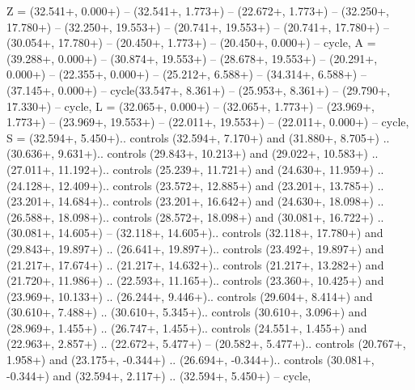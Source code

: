 {Z} = {(32.541+\ctpXshift, 0.000+\ctpYshift) -- (32.541+\ctpXshift, 1.773+\ctpYshift) -- (22.672+\ctpXshift, 1.773+\ctpYshift) -- (32.250+\ctpXshift, 17.780+\ctpYshift) -- (32.250+\ctpXshift, 19.553+\ctpYshift) -- (20.741+\ctpXshift, 19.553+\ctpYshift) -- (20.741+\ctpXshift, 17.780+\ctpYshift) -- (30.054+\ctpXshift, 17.780+\ctpYshift) -- (20.450+\ctpXshift, 1.773+\ctpYshift) -- (20.450+\ctpXshift, 0.000+\ctpYshift) -- cycle},
{A} = {(39.288+\ctpXshift, 0.000+\ctpYshift) -- (30.874+\ctpXshift, 19.553+\ctpYshift) -- (28.678+\ctpXshift, 19.553+\ctpYshift) -- (20.291+\ctpXshift, 0.000+\ctpYshift) -- (22.355+\ctpXshift, 0.000+\ctpYshift) -- (25.212+\ctpXshift, 6.588+\ctpYshift) -- (34.314+\ctpXshift, 6.588+\ctpYshift) -- (37.145+\ctpXshift, 0.000+\ctpYshift) -- cycle(33.547+\ctpXshift, 8.361+\ctpYshift) -- (25.953+\ctpXshift, 8.361+\ctpYshift) -- (29.790+\ctpXshift, 17.330+\ctpYshift) -- cycle},
{L} = {(32.065+\ctpXshift, 0.000+\ctpYshift) -- (32.065+\ctpXshift, 1.773+\ctpYshift) -- (23.969+\ctpXshift, 1.773+\ctpYshift) -- (23.969+\ctpXshift, 19.553+\ctpYshift) -- (22.011+\ctpXshift, 19.553+\ctpYshift) -- (22.011+\ctpXshift, 0.000+\ctpYshift) -- cycle},
{S} = {(32.594+\ctpXshift, 5.450+\ctpYshift).. controls (32.594+\ctpXshift, 7.170+\ctpYshift) and (31.880+\ctpXshift, 8.705+\ctpYshift) .. (30.636+\ctpXshift, 9.631+\ctpYshift).. controls (29.843+\ctpXshift, 10.213+\ctpYshift) and (29.022+\ctpXshift, 10.583+\ctpYshift) .. (27.011+\ctpXshift, 11.192+\ctpYshift).. controls (25.239+\ctpXshift, 11.721+\ctpYshift) and (24.630+\ctpXshift, 11.959+\ctpYshift) .. (24.128+\ctpXshift, 12.409+\ctpYshift).. controls (23.572+\ctpXshift, 12.885+\ctpYshift) and (23.201+\ctpXshift, 13.785+\ctpYshift) .. (23.201+\ctpXshift, 14.684+\ctpYshift).. controls (23.201+\ctpXshift, 16.642+\ctpYshift) and (24.630+\ctpXshift, 18.098+\ctpYshift) .. (26.588+\ctpXshift, 18.098+\ctpYshift).. controls (28.572+\ctpXshift, 18.098+\ctpYshift) and (30.081+\ctpXshift, 16.722+\ctpYshift) .. (30.081+\ctpXshift, 14.605+\ctpYshift) -- (32.118+\ctpXshift, 14.605+\ctpYshift).. controls (32.118+\ctpXshift, 17.780+\ctpYshift) and (29.843+\ctpXshift, 19.897+\ctpYshift) .. (26.641+\ctpXshift, 19.897+\ctpYshift).. controls (23.492+\ctpXshift, 19.897+\ctpYshift) and (21.217+\ctpXshift, 17.674+\ctpYshift) .. (21.217+\ctpXshift, 14.632+\ctpYshift).. controls (21.217+\ctpXshift, 13.282+\ctpYshift) and (21.720+\ctpXshift, 11.986+\ctpYshift) .. (22.593+\ctpXshift, 11.165+\ctpYshift).. controls (23.360+\ctpXshift, 10.425+\ctpYshift) and (23.969+\ctpXshift, 10.133+\ctpYshift) .. (26.244+\ctpXshift, 9.446+\ctpYshift).. controls (29.604+\ctpXshift, 8.414+\ctpYshift) and (30.610+\ctpXshift, 7.488+\ctpYshift) .. (30.610+\ctpXshift, 5.345+\ctpYshift).. controls (30.610+\ctpXshift, 3.096+\ctpYshift) and (28.969+\ctpXshift, 1.455+\ctpYshift) .. (26.747+\ctpXshift, 1.455+\ctpYshift).. controls (24.551+\ctpXshift, 1.455+\ctpYshift) and (22.963+\ctpXshift, 2.857+\ctpYshift) .. (22.672+\ctpXshift, 5.477+\ctpYshift) -- (20.582+\ctpXshift, 5.477+\ctpYshift).. controls (20.767+\ctpXshift, 1.958+\ctpYshift) and (23.175+\ctpXshift, -0.344+\ctpYshift) .. (26.694+\ctpXshift, -0.344+\ctpYshift).. controls (30.081+\ctpXshift, -0.344+\ctpYshift) and (32.594+\ctpXshift, 2.117+\ctpYshift) .. (32.594+\ctpXshift, 5.450+\ctpYshift) -- cycle},
